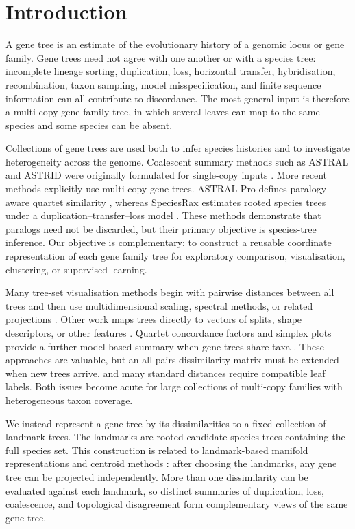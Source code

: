 \section{Introduction}

A gene tree is an estimate of the evolutionary history of a genomic locus or gene family. Gene trees need not agree
with one another or with a species tree: incomplete lineage sorting, duplication, loss, horizontal transfer,
hybridisation, recombination, taxon sampling, model misspecification, and finite sequence information can all contribute
to discordance. The most general input is therefore a multi-copy gene family tree, in which several leaves can map to the
same species and some species can be absent.

Collections of gene trees are used both to infer species histories and to investigate heterogeneity across the genome.
Coalescent summary methods such as ASTRAL and ASTRID were originally formulated for single-copy inputs
\citep{astral,astrid}. More recent methods explicitly use multi-copy gene trees. ASTRAL-Pro defines paralogy-aware quartet
similarity \citep{astral-pro}, whereas SpeciesRax estimates rooted species trees under a duplication--transfer--loss model
\citep{Morel2022SpeciesRax}. These methods demonstrate that paralogs need not be discarded, but their primary objective
is species-tree inference. Our objective is complementary: to construct a reusable coordinate representation of each
gene family tree for exploratory comparison, visualisation, clustering, or supervised learning.

Many tree-set visualisation methods begin with pairwise distances between all trees and then use multidimensional
scaling, spectral methods, or related projections \citep{Gori2016,Jombart2017,Huang2016}. Other work maps trees directly
to vectors of splits, shape descriptors, or other features
\citep{Leigh2008,Leigh2011,Susko2006,Narechania2016,Nye2011,Yoshida2015,Lewitus2015,Kendall2016,Colijn2018}.
Quartet concordance factors and simplex plots provide a further model-based summary when gene trees share taxa
\citep{Allman2022}. These approaches are valuable, but an all-pairs dissimilarity matrix must be extended when new trees
arrive, and many standard distances require compatible leaf labels. Both issues become acute for large collections of
multi-copy families with heterogeneous taxon coverage.

We instead represent a gene tree by its dissimilarities to a fixed collection of landmark trees. The landmarks are
rooted candidate species trees containing the full species set. This construction is related to landmark-based manifold
representations and centroid methods \citep{Jeon2001-qa,Park2003,Chen2011-bp,Vin_De_Silva2003-fq}: after choosing the
landmarks, any gene tree can be projected independently. More than one dissimilarity can be evaluated against each
landmark, so distinct summaries of duplication, loss, coalescence, and topological disagreement form complementary
views of the same gene tree.


